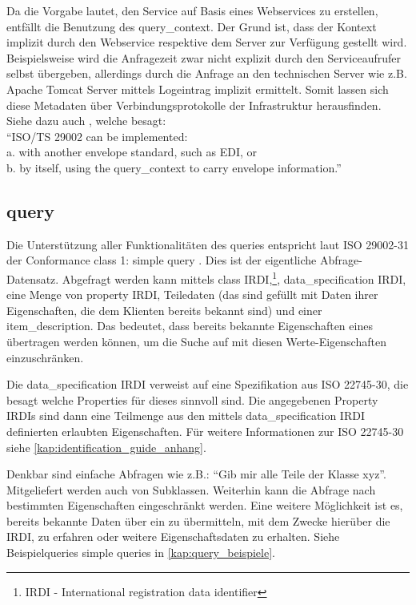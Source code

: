 Da die Vorgabe lautet, den Service auf Basis eines \glspl{Webservice} zu erstellen, entfällt die Benutzung des query\_context. Der Grund ist, dass der Kontext  implizit durch den \gls{Webservice} respektive dem Server zur Verfügung gestellt wird. Beispielsweise wird die Anfragezeit zwar nicht explizit durch den Serviceaufrufer selbst übergeben, allerdings durch die Anfrage an den technischen Server wie z.B. Apache Tomcat Server mittels Logeintrag implizit ermittelt. Somit lassen sich diese Metadaten über Verbindungsprotokolle der Infrastruktur herausfinden.  
Siehe dazu auch \citep[Kap. 6][]{iso29002-31}, welche besagt: \\ \enquote{ISO/TS 29002 can be implemented: \\
a. with another envelope standard, such as EDI, or \\
b. by itself, using the query\_context to carry envelope information.}

\subsection{query}\label{sec:query}
Die Unterstützung aller Funktionalitäten des queries entspricht laut ISO 29002-31 der Conformance class 1: simple query \citep[Anhang 6][]{iso29002-31}.
Dies ist der eigentliche Abfrage-Datensatz. Abgefragt werden kann mittels class \gls{IRDI},\footnote{IRDI  - International registration data identifier}, data\_specification IRDI, eine Menge von property \gls{IRDI}, Teiledaten (das sind  gefüllt mit Daten ihrer Eigenschaften, die dem Klienten bereits bekannt sind) und einer item\_description. Das bedeutet, dass bereits bekannte Eigenschaften eines  übertragen werden können, um die Suche auf  mit diesen Werte-Eigenschaften einzuschränken.

Die data\_specification IRDI verweist auf eine Spezifikation aus ISO 22745-30, die besagt welche Properties für dieses  sinnvoll sind. Die angegebenen Property \glspl{IRDI} sind dann eine Teilmenge aus den mittels data\_specification IRDI definierten erlaubten Eigenschaften. Für weitere Informationen zur ISO 22745-30 siehe \autoref{kap:identification_guide_anhang}. 

Denkbar sind einfache Abfragen wie z.B.: \enquote{Gib mir alle Teile der Klasse xyz}. Mitgeliefert werden auch  von Subklassen. Weiterhin kann die Abfrage nach bestimmten Eigenschaften eingeschränkt werden. Eine weitere Möglichkeit ist es, bereits bekannte Daten über ein  zu übermitteln, mit dem Zwecke hierüber die \gls{IRDI}, zu erfahren oder weitere Eigenschaftsdaten zu erhalten. Siehe Beispielqueries simple queries in \autoref{kap:query_beispiele}. 

